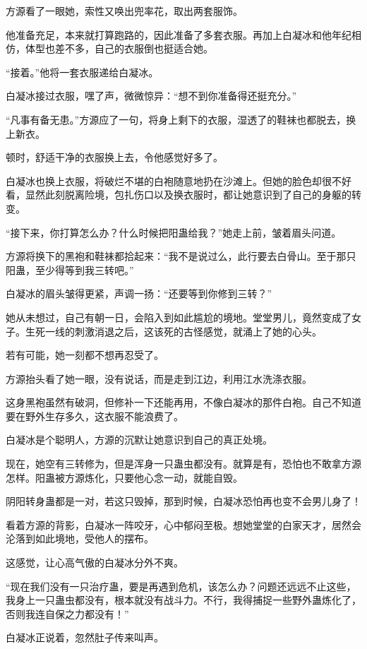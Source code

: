 \begin{this_body}
方源看了一眼她，索性又唤出兜率花，取出两套服饰。

他准备充足，本来就打算跑路的，因此准备了多套衣服。再加上白凝冰和他年纪相仿，体型也差不多，自己的衣服倒也挺适合她。

“接着。”他将一套衣服递给白凝冰。

白凝冰接过衣服，嘿了声，微微惊异：“想不到你准备得还挺充分。”

“凡事有备无患。”方源应了一句，将身上剩下的衣服，湿透了的鞋袜也都脱去，换上新衣。

顿时，舒适干净的衣服换上去，令他感觉好多了。

白凝冰也换上衣服，将破烂不堪的白袍随意地扔在沙滩上。但她的脸色却很不好看，显然此刻脱离险境，包扎伤口以及换衣服时，都让她意识到了自己的身躯的转变。

“接下来，你打算怎么办？什么时候把阳蛊给我？”她走上前，皱着眉头问道。

方源将换下的黑袍和鞋袜都拾起来：“我不是说过么，此行要去白骨山。至于那只阳蛊，至少得等到我三转吧。”

白凝冰的眉头皱得更紧，声调一扬：“还要等到你修到三转？”

她从未想过，自己有朝一日，会陷入到如此尴尬的境地。堂堂男儿，竟然变成了女子。生死一线的刺激消退之后，这该死的古怪感觉，就涌上了她的心头。

若有可能，她一刻都不想再忍受了。

方源抬头看了她一眼，没有说话，而是走到江边，利用江水洗涤衣服。

这身黑袍虽然有破洞，但修补一下还能再用，不像白凝冰的那件白袍。自己不知道要在野外生存多久，这衣服不能浪费了。

白凝冰是个聪明人，方源的沉默让她意识到自己的真正处境。

现在，她空有三转修为，但是浑身一只蛊虫都没有。就算是有，恐怕也不敢拿方源怎样。阳蛊被方源炼化，只要他心念一动，就能自毁。

阴阳转身蛊都是一对，若这只毁掉，那到时候，白凝冰恐怕再也变不会男儿身了！

看着方源的背影，白凝冰一阵咬牙，心中郁闷至极。想她堂堂的白家天才，居然会沦落到如此境地，受他人的摆布。

这感觉，让心高气傲的白凝冰分外不爽。

“现在我们没有一只治疗蛊，要是再遇到危机，该怎么办？问题还远远不止这些，我身上一只蛊虫都没有，根本就没有战斗力。不行，我得捕捉一些野外蛊炼化了，否则我连自保之力都没有！”

白凝冰正说着，忽然肚子传来叫声。


\end{this_body}
